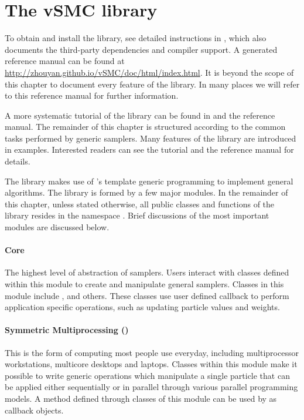 \section{The vSMC library}
\label{sec:The vSMC library}

To obtain and install the library, see detailed instructions in
\cite{vsmcjss}, which also documents the third-party dependencies and compiler
support. A \doxygen \cite{doxygen} generated reference manual can be found at
\url{http://zhouyan.github.io/vSMC/doc/html/index.html}. It is beyond the
scope of this chapter to document every feature of the \vsmc library. In many
places we will refer to this reference manual for further information.

A more systematic tutorial of the library can be found in \cite{vsmcjss} and
the reference manual. The remainder of this chapter is structured according to
the common tasks performed by generic \smc samplers. Many features of the
library are introduced in examples. Interested readers can see the tutorial
\cite{vsmcjss} and the reference manual for details.

The \vsmc library makes use of \cpp's template generic programming to
implement general \smc algorithms. The library is formed by a few major
modules. In the remainder of this chapter, unless stated otherwise, all public
classes and functions of the library resides in the namespace
. Brief discussions of the most important modules are
discussed below.

\paragraph{Core}

The highest level of abstraction of \smc samplers. Users interact with classes
defined within this module to create and manipulate general \smc samplers.
Classes in this module include ,  and
others. These classes use user defined callback to perform application
specific operations, such as updating particle values and weights.

\paragraph{Symmetric Multiprocessing (\smp)}

This is the form of computing most people use everyday, including
multiprocessor workstations, multicore desktops and laptops. Classes within
this module make it possible to write generic operations which manipulate a
single particle that can be applied either sequentially or in parallel through
various parallel programming models. A method defined through classes of this
module can be used by  as callback objects.

